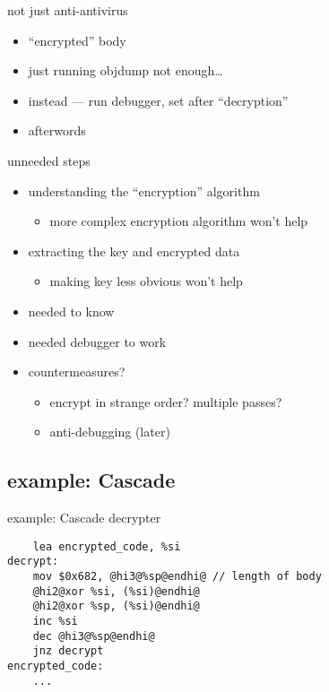 \begin{frame}{not just anti-antivirus}
    \begin{itemize}
    \item ``encrypted'' body 
    \item just running objdump not enough\ldots
    \item instead --- run debugger, set  after ``decryption''
    \item {} afterwords
    \end{itemize}
\end{frame}

\begin{frame}{unneeded steps}
    \begin{itemize}
    \item understanding the ``encryption'' algorithm
        \begin{itemize}
        \item more complex encryption algorithm won't help
        \end{itemize}
    \item extracting the key and encrypted data
        \begin{itemize}
        \item making key less obvious won't help
        \end{itemize}
    \vspace{.5cm}
    \item<2-> needed to know 
    \item<2-> needed debugger to work
    \item<3-> countermeasures?
        \begin{itemize}
        \item encrypt in strange order? multiple passes?
        \item anti-debugging (later)
        \end{itemize}
    \end{itemize}
\end{frame}

\subsection{example: Cascade}

\begin{frame}[fragile,label=cascade]{example: Cascade decrypter}
\begin{lstlisting}
    lea encrypted_code, %si
decrypt:
    mov $0x682, @hi3@%sp@endhi@ // length of body
    @hi2@xor %si, (%si)@endhi@
    @hi2@xor %sp, (%si)@endhi@
    inc %si
    dec @hi3@%sp@endhi@
    jnz decrypt
encrypted_code:
    ...
\end{lstlisting}
\end{frame}

